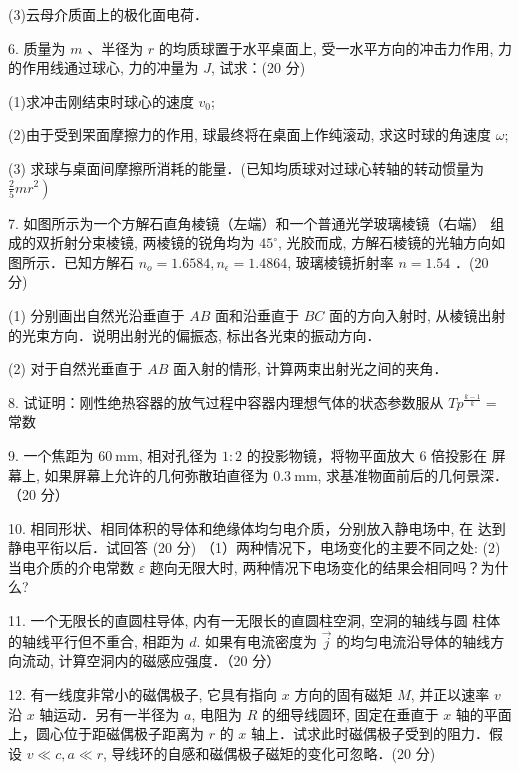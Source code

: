 (3)云母介质面上的极化面电荷．

6. 质量为 $m$ 、半径为 $r$ 的均质球置于水平桌面上, 受一水平方向的冲击力作用, 力的作用线通过球心, 力的冲量为 $J$, 试求：(20 分)

(1)求冲击刚结束时球心的速度 $v_{0}$;

(2)由于受到䍒面摩擦力的作用, 球最终将在桌面上作纯滚动, 求这时球的角速度 $\omega$;

(3) 求球与桌面间摩擦所消耗的能量．(已知均质球对过球心转轴的转动惯量为 $\left.\frac{2}{5} m r^{2}\right)$

7. 如图所示为一个方解石直角棱镜（左端）和一个普通光学玻璃棱镜（右端） 组成的双折射分束棱镜, 两棱镜的锐角均为 $45^{\circ}$, 光胶而成, 方解石棱镜的光轴方向如图所示．已知方解石 $n_{o}=1.6584, n_{\epsilon}=1.4864$, 玻璃棱镜折射率 $n=1.54$ ．(20 分)

(1) 分别画出自然光沿垂直于 $A B$ 面和沿垂直于 $B C$ 面的方向入射时, 从棱镜出射的光束方向．说明出射光的偏振态, 标出各光束的振动方向．

(2) 对于自然光垂直于 $A B$ 面入射的情形, 计算两束出射光之间的夹角．

8. 试证明：刚性绝热容器的放气过程中容器内理想气体的状态参数服从 $T p^{\frac{k-1}{k}}=$ 常数

9. 一个焦距为 $60 \mathrm{~mm}$, 相对孔径为 $1: 2$ 的投影物镜，将物平面放大 6 倍投影在 屏幕上, 如果屏幕上允许的几何弥散珀直径为 $0.3 \mathrm{~mm}$, 求基准物面前后的几何景深．
（20 分）

10. 相同形状、相同体积的导体和绝缘体均匀电介质，分别放入静电场中, 在 达到静电平衔以后．试回答
(20 分)
（1）两种情况下，电场变化的主要不同之处:
(2) 当电介质的介电常数 $\varepsilon$ 趂向无限大时, 两种情况下电场变化的结果会相同吗？为什么?

11. 一个无限长的直圆柱导体, 内有一无限长的直圆柱空洞, 空洞的轴线与圆 柱体的轴线平行但不重合, 相距为 $d$. 如果有电流密度为 $\vec{j}$ 的均匀电流沿导体的轴线方向流动, 计算空洞内的磁感应强度．（20 分）

12. 有一线度非常小的磁偶极子, 它具有指向 $x$ 方向的固有磁矩 $M$, 并正以速率 $v$ 沿 $x$ 轴运动．另有一半径为 $a$, 电阻为 $R$ 的细导线圆环, 固定在垂直于 $x$ 轴的平面上，圆心位于距磁偶极子距离为 $r$ 的 $x$ 轴上．试求此时磁偶极子受到的阻力．假设 $v \ll c, a \ll r$, 导线环的自感和磁偶极子磁矩的变化可忽略．(20 分)